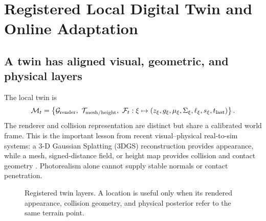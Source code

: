 \section{Registered Local Digital Twin and Online Adaptation}
\label{sec:twin}

\subsection{A twin has aligned visual, geometric, and physical layers}

The local twin is
\begin{equation}
\M_t=\left\{\mathcal G_{\mathrm{render}},\ \T_{\mathrm{mesh/height}},\ 
\mathcal F_t:\xi\mapsto(z_\xi,g_\xi,\mu_\xi,\Sigma_\xi,\ell_\xi,s_{\xi},t_{\mathrm{last}})\right\}.
\label{eq:twin}
\end{equation}
The renderer and collision representation are distinct but share a calibrated world frame. This is the important lesson from recent visual--physical real-to-sim systems: a 3-D Gaussian Splatting (3DGS) reconstruction provides appearance, while a mesh, signed-distance field, or height map provides collision and contact geometry \citep{kerbl20233dgs,chen2026quadverse,han2025re3sim}. Photorealism alone cannot supply stable normals or contact penetration.

\begin{figure}[ht]
\centering
{}
\caption{Registered twin layers. A location is useful only when its rendered appearance, collision geometry, and physical posterior refer to the same terrain point.}
\label{fig:twin_layers}
\end{figure}

